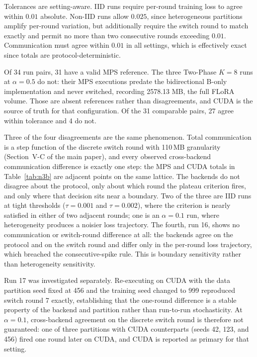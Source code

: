 \documentclass{ieeetj}
\begin{document}
Tolerances are setting-aware. IID runs require per-round training loss to agree within $0.01$ absolute. Non-IID runs allow $0.025$, since heterogeneous partitions amplify per-round variation, but additionally require the switch round to match exactly and permit no more than two consecutive rounds exceeding $0.01$. Communication must agree within $0.01$ in all settings, which is effectively exact since totals are protocol-deterministic.

Of 34 run pairs, 31 have a valid MPS reference. The three Two-Phase $K{=}8$ runs at $\alpha{=}0.5$ do not: their MPS executions predate the bidirectional B-only implementation and never switched, recording 2578.13 MB, the full FLoRA volume. Those are absent references rather than disagreements, and CUDA is the source of truth for that configuration. Of the 31 comparable pairs, 27 agree within tolerance and 4 do not.

Three of the four disagreements are the same phenomenon. Total communication is a step function of the discrete switch round with 110\,MB granularity (Section~V-C of the main paper), and every observed cross-backend communication difference is exactly one step: the MPS and CUDA totals in Table~\ref{tab:n3b} are adjacent points on the same lattice. The backends do not disagree about the protocol, only about which round the plateau criterion fires, and only where that decision sits near a boundary. Two of the three are IID runs at tight thresholds ($\tau{=}0.001$ and $\tau{=}0.002$), where the criterion is nearly satisfied in either of two adjacent rounds; one is an $\alpha{=}0.1$ run, where heterogeneity produces a noisier loss trajectory. The fourth, run 16, shows no communication or switch-round difference at all: the backends agree on the protocol and on the switch round and differ only in the per-round loss trajectory, which breached the consecutive-spike rule. This is boundary sensitivity rather than heterogeneity sensitivity.

Run 17 was investigated separately. Re-executing on CUDA with the data partition seed fixed at 456 and the training seed changed to 999 reproduced switch round 7 exactly, establishing that the one-round difference is a stable property of the backend and partition rather than run-to-run stochasticity. At $\alpha{=}0.1$, cross-backend agreement on the discrete switch round is therefore not guaranteed: one of three partitions with CUDA counterparts (seeds 42, 123, and 456) fired one round later on CUDA, and CUDA is reported as primary for that setting.
\end{document}
